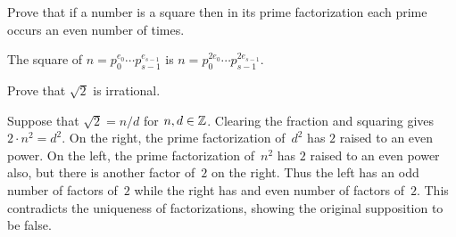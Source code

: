\documentclass{ibl}  %
\begin{document}
\begin{problem}[\maxlength]
\end{problem}

\begin{problem}[\midlength] 
\begin{exes}
\begin{exercise} 
  Prove that if a number is a square then in its prime factorization 
  each prime occurs an even number of times.
\end{exercise}
\begin{answer}
  The square of $n=p_0^{e_0}\cdots p_{s-1}^{e_{s-1}}$ is
  $n=p_0^{2e_0}\cdots p_{s-1}^{2e_{s-1}}$.  
\end{answer}
\begin{exercise} 
  Prove that $\sqrt{2}$ is irrational.
\end{exercise}
\begin{answer}
  Suppose that $\sqrt{2}=n/d$ for $n,d\in\mathbb{Z}$.
  Clearing the fraction and squaring gives $2\cdot n^2=d^2$.
  On the right, the prime factorization of~$d^2$ has $2$ raised to an even 
  power.
  On the left, the prime factorization of~$n^2$ has $2$ raised to an even power
  also, but there is another factor of~$2$ on the right.
  Thus the left has an odd number of factors of~$2$ while the right has
  and even number of factors of~$2$.
  This contradicts the uniqueness of factorizations, showing the 
  original supposition to be false.   
\end{answer}
\end{exes}

\end{problem}
\end{document}
